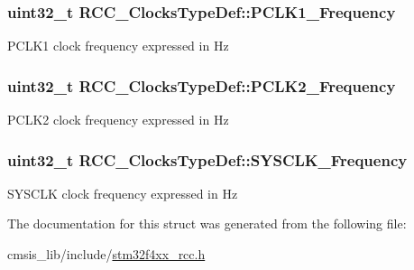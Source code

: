 \subsubsection[{\texorpdfstring{P\+C\+L\+K1\+\_\+\+Frequency}{PCLK1_Frequency}}]{\setlength{\rightskip}{0pt plus 5cm}uint32\+\_\+t R\+C\+C\+\_\+\+Clocks\+Type\+Def\+::\+P\+C\+L\+K1\+\_\+\+Frequency}\hypertarget{struct_r_c_c___clocks_type_def_add4cfc63c35178d187107edc764e0b8f}{}\label{struct_r_c_c___clocks_type_def_add4cfc63c35178d187107edc764e0b8f}
P\+C\+L\+K1 clock frequency expressed in Hz 
\subsubsection[{\texorpdfstring{P\+C\+L\+K2\+\_\+\+Frequency}{PCLK2_Frequency}}]{\setlength{\rightskip}{0pt plus 5cm}uint32\+\_\+t R\+C\+C\+\_\+\+Clocks\+Type\+Def\+::\+P\+C\+L\+K2\+\_\+\+Frequency}\hypertarget{struct_r_c_c___clocks_type_def_ad854f0b70a6c4cf6de6dbbdcbc99b856}{}\label{struct_r_c_c___clocks_type_def_ad854f0b70a6c4cf6de6dbbdcbc99b856}
P\+C\+L\+K2 clock frequency expressed in Hz 
\subsubsection[{\texorpdfstring{S\+Y\+S\+C\+L\+K\+\_\+\+Frequency}{SYSCLK_Frequency}}]{\setlength{\rightskip}{0pt plus 5cm}uint32\+\_\+t R\+C\+C\+\_\+\+Clocks\+Type\+Def\+::\+S\+Y\+S\+C\+L\+K\+\_\+\+Frequency}\hypertarget{struct_r_c_c___clocks_type_def_a2ba325067f3d464ad7955358932563d8}{}\label{struct_r_c_c___clocks_type_def_a2ba325067f3d464ad7955358932563d8}
S\+Y\+S\+C\+LK clock frequency expressed in Hz 

The documentation for this struct was generated from the following file\+:\begin{DoxyCompactItemize}
\item 
cmsis\+\_\+lib/include/\hyperlink{stm32f4xx__rcc_8h}{stm32f4xx\+\_\+rcc.\+h}\end{DoxyCompactItemize}
